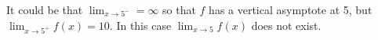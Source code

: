 \documentclass{ximera}
\begin{document}
\begin{exercise}
\begin{exercise}
\begin{exercise}
\begin{exercise}
    				\begin{feedback}
    					It could be that $\displaystyle \lim_{x\to5^-} = \infty$ so that $f$ has a vertical asymptote at 5, but $\lim_{x\to5^+}f(x)=10$.  In this case $\lim_{x\to5}f(x)$ does not exist.
    				\end{feedback}
    			\end{exercise}
		\end{exercise}
	\end{exercise}
\end{exercise}
\end{document}

